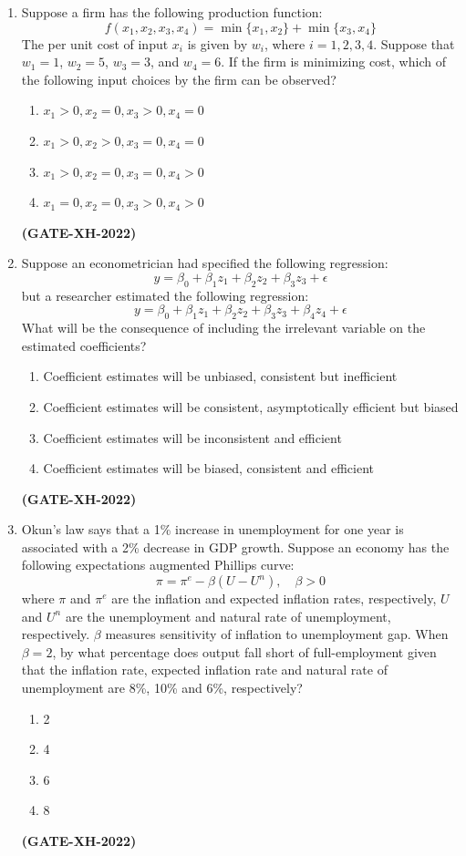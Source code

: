\documentclass[journal]{IEEEtran}
\begin{document}
\begin{enumerate}
\item Suppose a firm has the following production function:
\[
f(x_1, x_2, x_3, x_4) = \min\{x_1, x_2\} + \min\{x_3, x_4\}
\]
The per unit cost of input $x_i$ is given by $w_i$, where $i = 1, 2, 3, 4$. Suppose that $w_1 = 1$, $w_2 = 5$, $w_3 = 3$, and $w_4 = 6$. If the firm is minimizing cost, which of the following input choices by the firm can be observed?
\begin{multicols}{2}
\begin{enumerate}
\item $x_1 > 0, x_2 = 0, x_3 > 0, x_4 = 0$
\item $x_1 > 0, x_2 > 0, x_3 = 0, x_4 = 0$
\item $x_1 > 0, x_2 = 0, x_3 = 0, x_4 > 0$
\item $x_1 = 0, x_2 = 0, x_3 > 0, x_4 > 0$
\end{enumerate}
\end{multicols}
\hfill\textbf{(GATE-XH-2022)}
\item Suppose an econometrician had specified the following regression:
\[
y = \beta_0 + \beta_1 z_1 + \beta_2 z_2 + \beta_3 z_3 + \epsilon
\]
but a researcher estimated the following regression:
\[
y = \beta_0 + \beta_1 z_1 + \beta_2 z_2 + \beta_3 z_3 + \beta_4 z_4 + \epsilon
\]
What will be the consequence of including the irrelevant variable on the estimated coefficients?
\begin{enumerate}
\item Coefficient estimates will be unbiased, consistent but inefficient
\item Coefficient estimates will be consistent, asymptotically efficient but biased
\item Coefficient estimates will be inconsistent and efficient
\item Coefficient estimates will be biased, consistent and efficient
\end{enumerate}
\hfill\textbf{(GATE-XH-2022)}

\item Okun’s law says that a 1\% increase in unemployment for one year is associated with a 2\% decrease in GDP growth. Suppose an economy has the following expectations augmented Phillips curve:
\[
\pi = \pi^e - \beta(U - U^n), \quad \beta > 0
\]
where $\pi$ and $\pi^e$ are the inflation and expected inflation rates, respectively, $U$ and $U^n$ are the unemployment and natural rate of unemployment, respectively. $\beta$ measures sensitivity of inflation to unemployment gap. When $\beta = 2$, by what percentage does output fall short of full-employment given that the inflation rate, expected inflation rate and natural rate of unemployment are 8\%, 10\% and 6\%, respectively?
\begin{multicols}{4}
\begin{enumerate}
\item 2
\item 4
\item 6
\item 8
\end{enumerate}
\end{multicols}
\hfill\textbf{(GATE-XH-2022)}


\end{enumerate}
\end{document}
